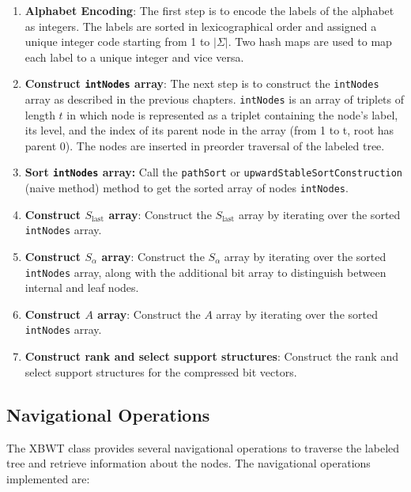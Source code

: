 \begin{enumerate}
    \item \textbf{Alphabet Encoding}: The first step is to encode the labels of the alphabet as integers. The labels are sorted in lexicographical order and assigned a unique integer code starting from 1 to $|\Sigma|$. Two hash maps are used to map each label to a unique integer and vice versa. 
    \item \textbf{Construct \texttt{intNodes} array}: The next step is to construct the \texttt{intNodes} array as described in the previous chapters. \texttt{intNodes} is an array of triplets of length $t$ in which node is represented as a triplet containing the node's label, its level, and the index of its parent node in the array (from 1 to t, root has parent 0). The nodes are inserted in preorder traversal of the labeled tree.
    \item \textbf{Sort \texttt{intNodes} array:} Call the \texttt{pathSort} or \texttt{upwardStableSortConstruction} (naive method) method to get the sorted array of nodes \texttt{intNodes}.
    \item \textbf{Construct $S_{\text{last}}$ array}: Construct the $S_{\text{last}}$ array by iterating over the sorted \texttt{intNodes} array.
    \item \textbf{Construct $S_{\alpha}$ array}: Construct the $S_{\alpha}$ array by iterating over the sorted \texttt{intNodes} array, along with the additional bit array to distinguish between internal and leaf nodes.
    \item \textbf{Construct $A$ array}: Construct the $A$ array by iterating over the sorted \texttt{intNodes} array.
    \item \textbf{Construct rank and select support structures}: Construct the rank and select support structures for the compressed bit vectors.
\end{enumerate}

\subsection{Navigational Operations}
The XBWT class provides several navigational operations to traverse the labeled tree and retrieve information about the nodes. The navigational operations implemented are:

